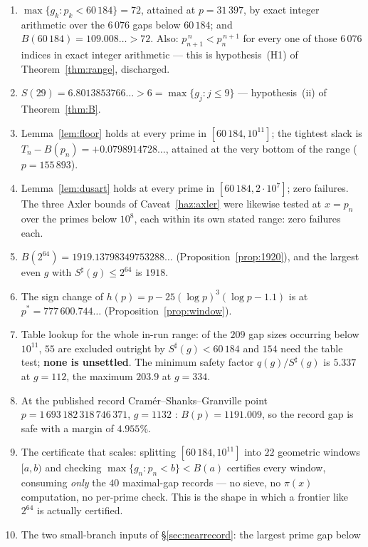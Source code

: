 \documentclass[11pt,a4paper]{article}
\theoremstyle{plain}
\theoremstyle{definition}
\theoremstyle{remark}
\begin{document}
\begin{enumerate}
\item[V1] $\max\{g_k : p_k < 60\,184\} = 72$, attained at $p = 31\,397$, by
  exact integer arithmetic over the $6\,076$ gaps below $60\,184$; and
  $B(60\,184) = 109.008\ldots > 72$. Also: $p_{n+1}^{\,n} < p_n^{\,n+1}$ for every one of
  those $6\,076$ indices in exact integer arithmetic --- this is hypothesis~(H1) of
  Theorem~\ref{thm:range}, discharged.
\item[V2] $S(29) = 6.8013853766\ldots > 6 = \max\{g_j : j \le 9\}$ ---
  hypothesis~(ii) of Theorem~\ref{thm:B}.
\item[V3] Lemma~\ref{lem:floor} holds at every prime in $[60\,184, 10^{11}]$; the tightest
  slack is $T_n - B(p_n) = +0.0798914728\ldots$, attained at the very bottom of the range
  ($p = 155\,893$).
\item[V4] Lemma~\ref{lem:dusart} holds at every prime in $[60\,184, 2\cdot10^7]$; zero
  failures. The three Axler bounds of Caveat~\ref{haz:axler} were likewise tested at $x = p_n$
  over the primes below $10^8$, each within its own stated range: zero failures each.
\item[V5] $B(2^{64}) = 1919.13798349753288\ldots$ (Proposition~\ref{prop:1920}), and the
  largest even $g$ with $S^\sharp(g) \le 2^{64}$ is $1918$.
\item[V6] The sign change of $h(p) = p - 25(\log p)^3(\log p - 1.1)$ is at
  $p^* = 777\,600.744\ldots$ (Proposition~\ref{prop:window}).
\item[V7] Table lookup for the whole in-run range: of the $209$ gap sizes occurring below
  $10^{11}$, $55$ are excluded outright by $S^\sharp(g) < 60\,184$ and $154$ need the table
  test; \textbf{none is unsettled}. The minimum safety factor $q(g)/S^\sharp(g)$ is
  $5.337$ at $g = 112$, the maximum $203.9$ at $g = 334$.
\item[V8] At the published record Cram\'er--Shanks--Granville point
  $p = 1\,693\,182\,318\,746\,371$, $g = 1132$ \cite{oeisA111943}: $B(p) = 1191.009$, so the
  record gap is safe with a margin of $4.955\%$.
\item[V9] The certificate that scales: splitting $[60\,184, 10^{11}]$ into $22$ geometric
  windows $[a,b)$ and checking $\max\{g_n : p_n < b\} < B(a)$ certifies every window,
  consuming \emph{only} the $40$ maximal-gap records --- no sieve, no $\pi(x)$ computation,
  no per-prime check. This is the shape in which a frontier like $2^{64}$ is actually
  certified.
\item[V10] The two small-branch inputs of \S\ref{sec:nearrecord}: the largest prime gap below

\end{enumerate}
\end{document}
